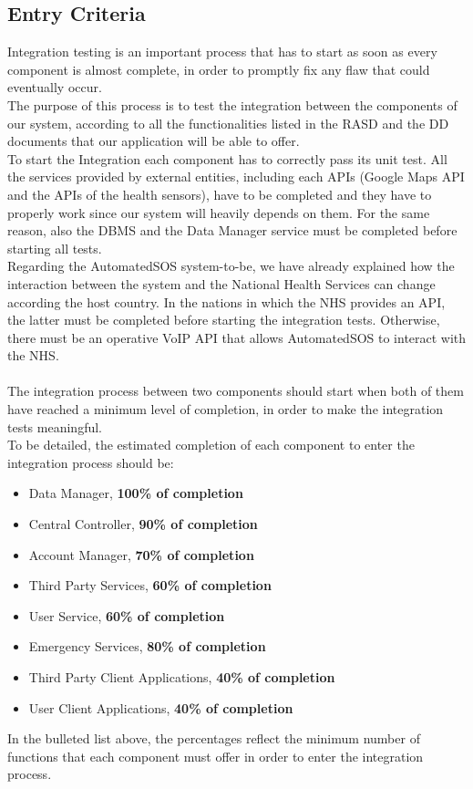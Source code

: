 \subsection{Entry Criteria}
Integration testing is an important process that has to start as soon as every component is almost complete, in order to promptly fix any flaw that could eventually occur. \\
The purpose of this process is to test the integration between the components of our system, according to all the functionalities listed in the RASD and the DD documents that our application will be able to offer. \\
To start the Integration each component has to correctly pass its unit test.
All the services provided by external entities, including each APIs (Google Maps API and the APIs of the health sensors), have to be completed and they have to properly work since our system will heavily depends on them. For the same reason, also the DBMS and the Data Manager service must be completed before starting all tests. \\
Regarding the AutomatedSOS system-to-be, we have already explained how the interaction between the system and the National Health Services can change according the host country. In the nations in which the NHS provides an API, the latter must be completed before starting the integration tests. Otherwise, there must be an operative VoIP API that allows AutomatedSOS to interact with the NHS.\\ \\
The integration process between two components should start when both of them have reached a minimum level of completion, in order to make the integration tests meaningful.\\
To be detailed, the estimated completion of each component to enter the integration process should be:
\begin{itemize}
    \item Data Manager, \textbf{100\% of completion}
    \item Central Controller, \textbf{90\% of completion}
    \item Account Manager, \textbf{70\% of completion}
    \item Third Party Services, \textbf{60\% of completion}
    \item User Service, \textbf{60\% of completion}
    \item Emergency Services, \textbf{80\% of completion}
    \item Third Party Client Applications, \textbf{40\% of completion}
    \item User Client Applications, \textbf{40\% of completion}
\end{itemize}
In the bulleted list above, the percentages reflect the minimum number of functions that each component must offer in order to enter the integration process.
\clearpage

